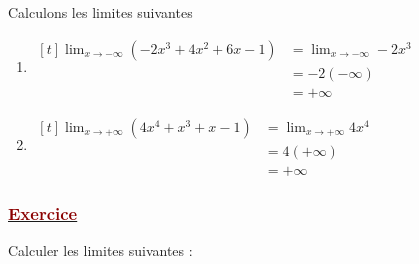\documentclass[12pt,a4paper]{article}
\begin{document}
Calculons les limites suivantes

\vspace{0.2cm}

\begin{enumerate}
    \item 
    
    $\begin{aligned}[t]
        \lim_{x \to -\infty} (-2x^3 + 4x^2 + 6x - 1) &= \lim_{x \to -\infty} -2x^3 \\
        &= -2(-\infty)\\ 
        &= +\infty
    \end{aligned}$
    
    
    \vspace{0.4cm}
    
    \item 
    
    $\begin{aligned}[t]
        \lim_{x \to +\infty} (4x^4 + x^3 + x - 1) &= \lim_{x \to +\infty} 4x^4 \\
        &= 4(+\infty)\\ 
        &= +\infty
    \end{aligned}$
    
\end{enumerate}


\subsubsection*{\underline{\textcolor{darkred}{ Exercice }}} 

Calculer les limites suivantes :
\vspace{0.3cm}
\end{document}
